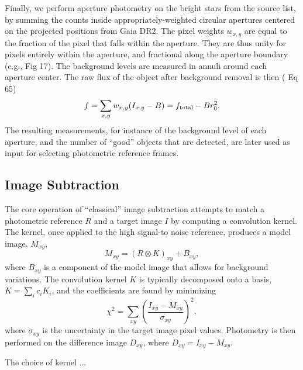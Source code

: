 \documentclass[12pt,twocolumn,tighten]{aastex62}
\begin{document}
Finally, we perform aperture photometry on the bright stars from the
source list, by summing the counts inside appropriately-weighted
circular apertures centered on the projected positions from Gaia DR2. 
The pixel weights $w_{x,y}$ are equal to the fraction of the pixel
that falls within the aperture.  They are thus unity for pixels
entirely within the aperture, and fractional along the aperture
boundary (e.g., \citealt{Pal_2009} Fig 17). 
The background levels are measured in annuli around each aperture
center.  The raw flux of the object after background removal is then
(\citealt{Pal_2009} Eq 65)
\begin{equation}
  f = \sum_{x,y} w_{x,y} (I_{x,y} - B) = f_{\rm total} - B r_0^2.
  \label{eq:simple_aperture_phot}
\end{equation}
The resulting measurements, for instance of the background level of
each aperture, and the number of ``good'' objects that are detected,
are later used as input for selecting photometric reference frames.


\subsection{Image Subtraction}
\label{subsec:imagesubtraction}

The core operation of ``classical'' image subtraction
attempts to match a photometric reference $R$ and a target image $I$ by 
computing a convolution kernel.
The kernel, once applied to the high signal-to noise reference,
produces a model image, $M_{xy}$,
\begin{equation}
    M_{xy} = (R \otimes K)_{xy} + B_{xy},
\end{equation}
where $B_{xy}$ is a component of the model image that allows for
background variations.
The convolution kernel $K$ is typically decomposed onto a
basis, $K = \sum_i c_i K_i$, and the coefficients are found
by minimizing
\begin{equation}
    \chi^2 = \sum_{xy} \left( \frac{I_{xy} - M_{xy}}{\sigma_{xy}} \right)^2,
\end{equation}
where $\sigma_{xy}$ is the uncertainty in the target image pixel values.
Photometry is then performed on the difference image $D_{xy}$, where
$D_{xy} = I_{xy} - M_{xy}$.

The choice of kernel ...
\end{document}
